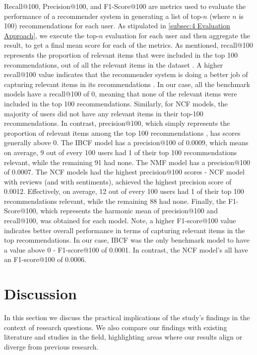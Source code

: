 Recall@100, Precision@100, and F1-Score@100 are metrics used to evaluate the performance of a recommender system in generating a list of top-$n$ (where $n$ is 100) recommendations for each user. As stipulated in \ref{subsec:4 Evaluation Approach}, we execute the top-$n$ evaluation for each user and then aggregate the result, to get a final mean score for each of the metrics. As mentioned, recall@100 represents the proportion of relevant items that were included in the top 100 recommendations, out of all the relevant items in the dataset \cite{cremonesi2010performance}. A higher recall@100 value indicates that the recommender system is doing a better job of capturing relevant items in its recommendations \cite{cremonesi2010performance}. In our case, all the benchmark models  have a recall@100 of 0, meaning that none of the relevant items were included in the top 100 recommendations. Similarly, for NCF models, the majority of users did not have any relevant items in their top-100 recommendations. In contrast, precision@100, which simply represents the proportion of relevant items among the top 100 recommendations \cite{cremonesi2010performance}, has scores generally above 0. The IBCF model has a precision@100 of 0.0009, which means on average, 9 out of every 100 users had 1 of their top 100 recommendations relevant, while the remaining 91 had none. The NMF model has a precision@100 of 0.0007. The NCF models had the highest precision@100 scores - NCF model with reviews (and with sentiments), achieved the highest precision score of 0.0012. Effectively, on average, 12 out of every 100 users had 1 of their top 100 recommendations relevant, while the remaining 88 had none. Finally, the F1-Score@100, which represents the harmonic mean of precision@100 and recall@100, was obtained for each model. Note, a higher F1-score@100 value indicates better overall performance in terms of capturing relevant items in the top recommendations. In our case, IBCF was the only benchmark model to have a value above 0 - F1-score@100 of 0.0001. In contrast, the NCF model's all have an F1-score@100 of 0.0006. 

\section{Discussion}
\label{sec:5 Discussion}

In this section we discuss the practical implications of the study's findings in the context of research questions. We also compare our findings with existing literature and studies in the field, highlighting areas where our results align or diverge from previous research. 

